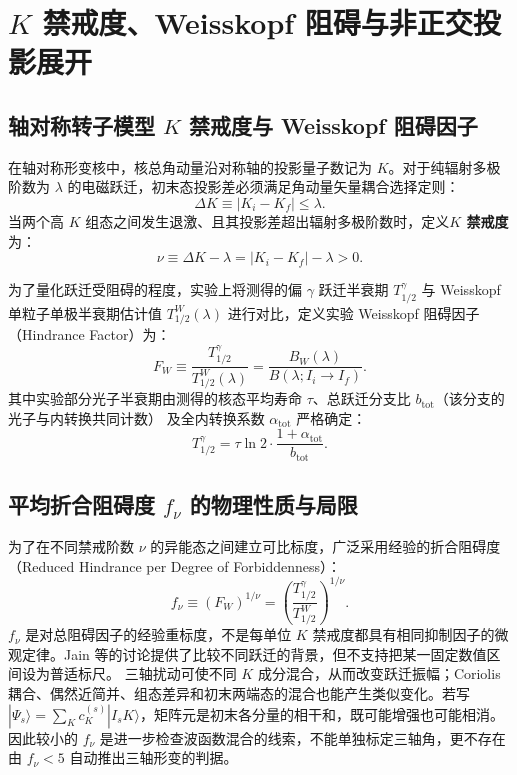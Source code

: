 \section{$K$ 禁戒度、Weisskopf 阻碍与非正交投影展开}\label{sec:appD-k-forbidden}

\subsection{轴对称转子模型 $K$ 禁戒度与 Weisskopf 阻碍因子}

在轴对称形变核中，核总角动量沿对称轴的投影量子数记为 $K$。对于纯辐射多极阶数为 $\lambda$ 的电磁跃迁，初末态投影差必须满足角动量矢量耦合选择定则：
\begin{equation}\label{eq:appD-k-selection-rule}
\Delta K \equiv |K_i - K_f| \le \lambda.
\end{equation}
当两个高 $K$ 组态之间发生退激、且其投影差超出辐射多极阶数时，定义\textbf{$K$ 禁戒度}为：
\begin{equation}\label{eq:appD-k-forbiddenness-nu}
\nu \equiv \Delta K - \lambda = |K_i - K_f| - \lambda > 0.
\end{equation}

为了量化跃迁受阻碍的程度，实验上将测得的偏 $\gamma$ 跃迁半衰期 $T_{1/2}^\gamma$ 与 Weisskopf 单粒子单极半衰期估计值 $T_{1/2}^W(\lambda)$ 进行对比，定义实验 Weisskopf 阻碍因子（Hindrance Factor）为：
\begin{equation}\label{eq:appD-hindrance-factor}
F_W \equiv \frac{T_{1/2}^\gamma}{T_{1/2}^W(\lambda)} = \frac{B_W(\lambda)}{B(\lambda; I_i \to I_f)}.
\end{equation}
其中实验部分光子半衰期由测得的核态平均寿命 $\tau$、总跃迁分支比 $b_{\mathrm{tot}}$（该分支的光子与内转换共同计数） 及全内转换系数 $\alpha_{\mathrm{tot}}$ 严格确定：
\begin{equation}\label{eq:appD-t12-gamma}
T_{1/2}^\gamma = \tau \ln 2 \cdot \frac{1 + \alpha_{\mathrm{tot}}}{b_{\mathrm{tot}}}.
\end{equation}

\subsection{平均折合阻碍度 $f_\nu$ 的物理性质与局限}

为了在不同禁戒阶数 $\nu$ 的异能态之间建立可比标度，广泛采用经验的折合阻碍度（Reduced Hindrance per Degree of Forbiddenness）：
\begin{equation}\label{eq:appD-fnu-def}
f_\nu \equiv (F_W)^{1/\nu} = \left( \frac{T_{1/2}^\gamma}{T_{1/2}^W} \right)^{1/\nu}.
\end{equation}
$f_\nu$ 是对总阻碍因子的经验重标度，不是每单位 $K$ 禁戒度都具有相同抑制因子的微观定律。Jain 等的讨论提供了比较不同跃迁的背景\cite{book-jain-nuclear-isomers}，但不支持把某一固定数值区间设为普适标尺。
三轴扰动可使不同 $K$ 成分混合，从而改变跃迁振幅；Coriolis 耦合、偶然近简并、组态差异和初末两端态的混合也能产生类似变化。若写
$|\Psi_s\rangle=\sum_K c_K^{(s)}|I_sK\rangle$，矩阵元是初末各分量的相干和，既可能增强也可能相消。因此较小的 $f_\nu$ 是进一步检查波函数混合的线索，不能单独标定三轴角，更不存在由 $f_\nu<5$ 自动推出三轴形变的判据。

